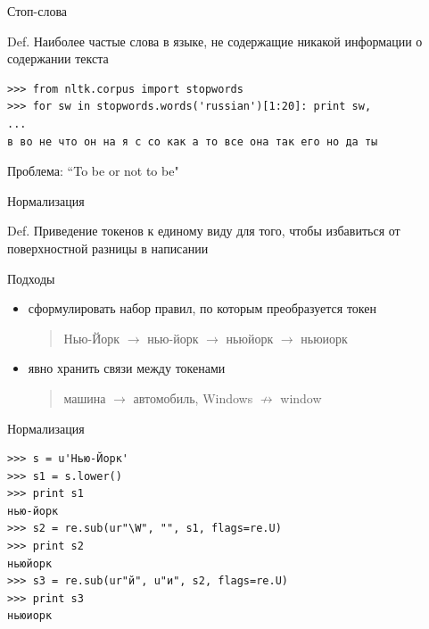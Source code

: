 \documentclass[10pt,a4paper]{beamer}
\begin{document}
\begin{frame}[fragile]{Стоп-слова}

\begin{block}{Def.}
Наиболее частые слова в языке, не содержащие никакой информации о содержании текста
\end{block}

\begin{shaded}
{\color{green}
\begin{verbatim}
>>> from nltk.corpus import stopwords
>>> for sw in stopwords.words('russian')[1:20]: print sw,
... 
в во не что он на я с со как а то все она так его но да ты
\end{verbatim}
}
\end{shaded}

\vspace{1em}
Проблема: ``To be or not to be"

\end{frame}


\begin{frame}[fragile]{Нормализация}

\begin{block}{Def.}
Приведение токенов к единому виду для того, чтобы избавиться от поверхностной разницы в написании
\end{block}

\vspace{1em}
Подходы
\begin{itemize}
\item сформулировать набор правил, по которым преобразуется токен
\begin{quote}
Нью-Йорк $\rightarrow$ нью-йорк $\rightarrow$ ньюйорк $\rightarrow$ ньюиорк
\end{quote}
\item явно хранить связи между токенами
\begin{quote}
машина $\rightarrow$ автомобиль, Windows $\not \rightarrow$ window
\end{quote}
\end{itemize}

\end{frame}


\begin{frame}[fragile]{Нормализация}

\begin{shaded}
{\color{green}
\begin{verbatim}
>>> s = u'Нью-Йорк'
>>> s1 = s.lower()
>>> print s1
нью-йорк
>>> s2 = re.sub(ur"\W", "", s1, flags=re.U)
>>> print s2
ньюйорк
>>> s3 = re.sub(ur"й", u"и", s2, flags=re.U)
>>> print s3
ньюиорк
\end{verbatim}}
\end{shaded}

\end{frame}
\end{document}
